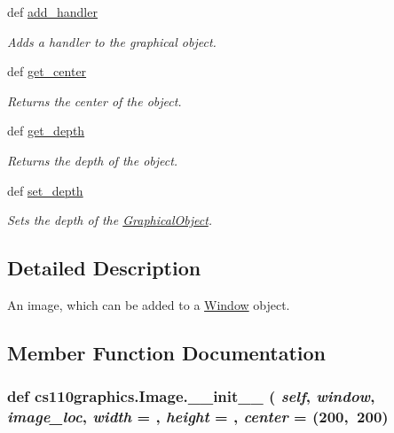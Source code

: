 \begin{DoxyCompactItemize}
def \hyperlink{classcs110graphics_1_1GraphicalObject_adb1af0d5a6baae3f9a08d21a3227c49f}{add\_\-handler}
\begin{DoxyCompactList}\small\item\em Adds a handler to the graphical object. \item\end{DoxyCompactList}\item 
def \hyperlink{classcs110graphics_1_1GraphicalObject_a062789c4cc9de38af32dcc4ff2058607}{get\_\-center}
\begin{DoxyCompactList}\small\item\em Returns the center of the object. \item\end{DoxyCompactList}\item 
def \hyperlink{classcs110graphics_1_1GraphicalObject_a6d9f5718cd0cf249e0d2842971bae17f}{get\_\-depth}
\begin{DoxyCompactList}\small\item\em Returns the depth of the object. \item\end{DoxyCompactList}\item 
def \hyperlink{classcs110graphics_1_1GraphicalObject_a20d76d4ee4419c3065d61deb6cbc6700}{set\_\-depth}
\begin{DoxyCompactList}\small\item\em Sets the depth of the \hyperlink{classcs110graphics_1_1GraphicalObject}{GraphicalObject}. \item\end{DoxyCompactList}\end{DoxyCompactItemize}


\subsection{Detailed Description}
An image, which can be added to a \hyperlink{classcs110graphics_1_1Window}{Window} object. 

\subsection{Member Function Documentation}
\hypertarget{classcs110graphics_1_1Image_a3b7c128fa18d85ff4a7586fac04a1bc2}{
\subsubsection[{\_\-\_\-init\_\-\_\-}]{\setlength{\rightskip}{0pt plus 5cm}def cs110graphics.Image.\_\-\_\-init\_\-\_\- ( {\em self}, \/   {\em window}, \/   {\em image\_\-loc}, \/   {\em width} = {}, \/   {\em height} = {}, \/   {\em center} = {\ttfamily (200,~200})}}
\label{classcs110graphics_1_1Image_a3b7c128fa18d85ff4a7586fac04a1bc2}

